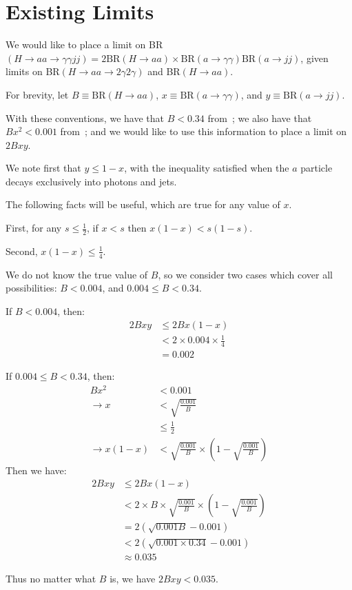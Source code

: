 \section{Existing Limits}
\label{sec:HBSM_app:existinglimits}
We would like to place a limit on BR$(H\rightarrow aa\rightarrow \gamma\gamma jj) = 2\text{BR}(H\rightarrow aa)\times\text{BR}(a\rightarrow\gamma\gamma)\text{BR}(a\rightarrow jj)$,
given limits on BR$(H\rightarrow aa\rightarrow 2\gamma2\gamma)$ and BR$(H\rightarrow aa)$.

\noindent For brevity, let $B\equiv \text{BR}(H\rightarrow aa)$, $x\equiv \text{BR}(a\rightarrow\gamma\gamma)$, and $y\equiv \text{BR}(a\rightarrow jj)$.

\noindent With these conventions, we have that $B<0.34$ from~\cite{Khachatryan:2016vau}; we also have that $Bx^2<0.001$ from~\cite{Aad:2015bua}; and we would like to use this information to place a limit on $2Bxy$. 

\noindent We note first that $y\le 1-x$, with the inequality satisfied when the $a$ particle decays exclusively into photons and jets.

\noindent The following facts will be useful, which are true for any value of $x$.

\noindent First, for any $s\le\frac{1}{2}$, if $x<s$ then $x(1-x)<s(1-s)$.

\noindent Second, $x(1-x)\le \frac{1}{4}$.

\noindent We do not know the true value of $B$,
so we consider two cases which cover all possibilities: $B<0.004$, and $0.004\le B<0.34$.

\noindent If $B<0.004$, then:
\begin{align*}
2Bxy &\le 2Bx(1-x) \\
&<2\times0.004\times\frac{1}{4} \\
&=0.002
\end{align*}

\noindent If $0.004\le B<0.34$, then: 
\begin{align*}
Bx^2 &< 0.001\\
\rightarrow x&<\sqrt{\frac{0.001}{B}}\\
&\le \frac{1}{2}\\
\rightarrow x(1-x)&<\sqrt{\frac{0.001}{B}}\times\left(1-\sqrt{\frac{0.001}{B}}\right)
\end{align*}
\noindent Then we have: 
\begin{align*}
2Bxy &\le 2Bx(1-x) \\
&<2\times B\times\sqrt{\frac{0.001}{B}}\times\left(1-\sqrt{\frac{0.001}{B}}\right) \\
&=2(\sqrt{0.001B}-0.001)\\
&<2(\sqrt{0.001\times0.34}-0.001)\\
&\approx 0.035
\end{align*}

\noindent Thus no matter what $B$ is, we have $2Bxy<0.035$.
